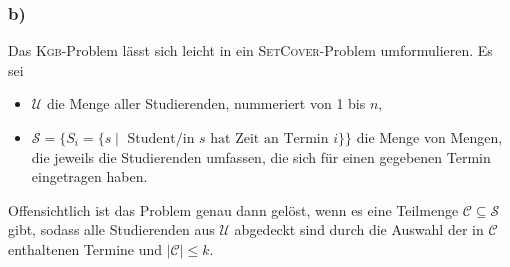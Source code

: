 \documentclass{article}
\begin{document}
\subsubsection{b)}

Das \textsc{Kgb}-Problem lässt sich leicht in ein \textsc{SetCover}-Problem
umformulieren. Es sei
\begin{itemize}[label=$\circ$]
   \item $\mathcal{U}$ die Menge aller Studierenden, nummeriert von 1 bis $n$,
   \item $\mathcal{S} = \{S_i = \{ s \mid \text{ Student/in $s$ hat Zeit an
      Termin $i$}\}\}$ die Menge von Mengen, die jeweils die Studierenden umfassen,
      die sich für einen gegebenen Termin eingetragen haben.
\end{itemize}

Offensichtlich ist das Problem genau dann gelöst, wenn es eine Teilmenge
$\mathcal{C} \subseteq \mathcal{S}$ gibt, sodass alle Studierenden aus
$\mathcal{U}$ abgedeckt sind durch die Auswahl der in $\mathcal{C}$ enthaltenen
Termine und $|\mathcal{C}| \le k$.
\end{document}
